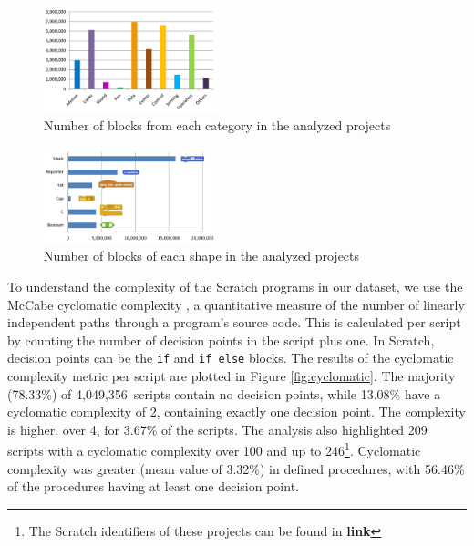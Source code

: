 \documentclass{sig-alternate}
\newcommand{\nscripts}{4,049,356}
\newcommand{\todo}[1]{\textbf{#1}}
\begin{document}
\begin{figure}
	\centering
	\includegraphics[width=0.45\textwidth]{fig/charts/16Categories}
	\caption{Number of blocks from each category in the analyzed projects}
	\label{fig:categories}
\end{figure}
\begin{figure}
	\centering
	\includegraphics[width=0.45\textwidth]{fig/charts/16Shapes}
	\caption{Number of blocks of each shape in the analyzed projects}
	\label{fig:shapes}
\end{figure}

To understand the complexity of the Scratch programs in our dataset, we use the McCabe cyclomatic complexity \cite{mcCabe76},  a quantitative measure of the number of linearly independent paths through a program's source code. This is calculated per script by counting the number of decision points in the script plus one. In Scratch, decision points can be the \texttt{if} and \texttt{if else} blocks. The results of the cyclomatic complexity metric per script are plotted in Figure \ref{fig:cyclomatic}. The majority (78.33\%) of \nscripts~scripts contain no decision points, while 13.08\% have a cyclomatic complexity of 2, containing exactly one decision point. The complexity is higher, over 4, for 3.67\% of the scripts. The analysis also highlighted 209 scripts with a cyclomatic complexity over 100 and up to 246\footnote{The Scratch identifiers of these projects can be found in \todo{link}}. Cyclomatic complexity was greater (mean value of 3.32\%) in defined procedures, with 56.46\% of the procedures having at least one decision point.

\noindent
{}
\end{document}
